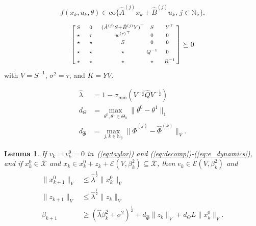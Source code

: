 \documentclass[10pt,a4paper]{amsart}
\newtheorem{lemma}{Lemma}
\begin{document}
\begin{equation}
f(x_k,u_k,\theta) \in\mathrm{co}\{\hat{A}^{(j)} x_k + \hat{B}^{(j)} u_k, \, j \in \mathbb{N}_{\hat{\nu}} \} .
\label{eq:ldi_term}
\end{equation} 

\begin{equation} \label{eq:cost_lmi}
\left[\begin{smallmatrix}
S & ~~~0~~~ & (\hat{A}^{(j)}S + \hat{B}^{(j)}Y)^\top & S & ~~Y^\top \\
\star & \tau & {w^{(r)}}^\top & 0 & 0 \\
\star\strut & \star & S & 0 & 0 \\
\star\strut & \star & \star & Q^{-1} & 0 \\
\star\strut & \star & \star & \star & ~~R^{-1}
\end{smallmatrix}\right] \succeq 0
\end{equation} with $V=S^{-1}$, $\sigma^2=\tau$, and $K =YV$.

\begin{align}
\hat{\lambda} &= 1 - \sigma_{\min} ( V^{-\frac{1}{2}} \hat{Q} V^{-\frac{1}{2}} )
\label{eq:lambda_term}
\\
d_\Theta &= \max_{\theta^0,\theta^1 \in\Theta_0} \| \theta^0 - \theta^1 \|_1
\label{eq:Theta_diam}
\\
d_{\hat{\Phi}} &= \max_{j,k\in\mathbb{N}_{\hat{\nu}}} \|
\hat{\Phi}^{(j)} - \hat{\Phi}^{(k)}\|_V .
\label{eq:Phi_diam}
\end{align}%

\begin{lemma}\label{lem:term_tube}
If $v_k=v^0_k=0$
in~(\ref{eq:taylor}) and (\ref{eq:decomp})-(\ref{eq:e_dynamics}), and if 
$x^0_k\in\bar{\mathcal{X}}$ and $x_k \in x^0_k+z_k+\mathcal{E}(V,\beta_k^2)\subseteq\bar{\mathcal{X}}$,
then $e_k \in \mathcal{E}(V,\beta_k^2)$ and
\begin{align}
\|x^0_{k+1}\|_V &\leq \hat{\lambda}^{\frac{1}{2}} \|x^0_k\|_V 
\label{eq:x0_term_bound}
\\
\|z_{k+1}\|_V &\leq \hat{\lambda}^{\frac{i}{2}} \|z_k\|_V 
\label{eq:z_term_bound}
\\
\beta_{k+1} &\geq (\hat{\lambda} \beta_{k}^2 +\sigma^2)^\frac{1}{2} + d_{\hat{\Phi}} \|z_{k}\|_V + 
d_\Theta L \|x_k^0\|_V .
\label{eq:beta_term_bound}
\end{align}
\end{lemma}
\end{document}
